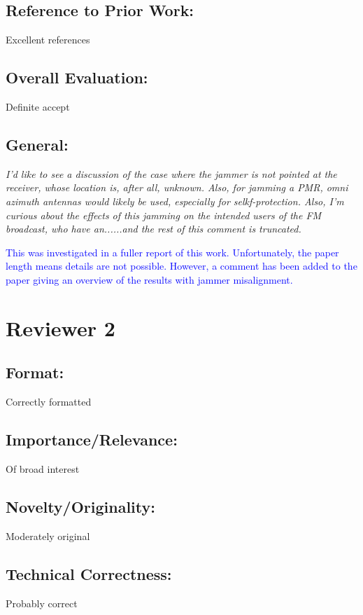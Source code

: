 \documentclass[11pt]{amsart}
\begin{document}
\subsection{Reference to Prior Work:}
 Excellent references

\subsection{Overall Evaluation:}
 Definite accept

\subsection{General:}

\emph{I'd like to see a discussion of the case where the jammer is not pointed at the receiver, whose location is, after all, unknown. Also, for jamming a PMR, omni azimuth antennas would likely be used, especially for selkf-protection.  Also, I'm curious about the effects of this jamming on the intended users of the FM broadcast, who have an......and the rest of this comment is truncated.}

\textcolor{blue}{
This was investigated in a fuller report of this work. Unfortunately, the paper length means details are not possible. However, a comment has been added to the paper giving an overview of the results with jammer misalignment.
}

\section{Reviewer 2}

\subsection{Format:}
 Correctly formatted

\subsection{Importance/Relevance: }

Of broad interest

\subsection{Novelty/Originality:}

 Moderately original

\subsection{Technical Correctness:}
 Probably correct
\end{document}
